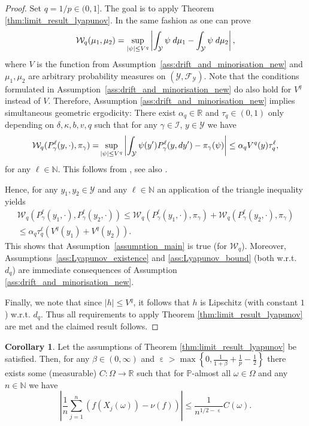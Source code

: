 \documentclass[12pt]{article}
\theoremstyle{definition}
\newtheorem{cor}[thm]{Corollary}
\renewcommand{\d}{{\rm d}}
\newcommand{\N}{\mathbb{N}}
\newcommand{\R}{\mathbb{R}}
\newcommand{\cY}{\mathcal{Y}}
\DeclareMathOperator{\eps}{\varepsilon}
\begin{document}
\begin{proof}
	Set $q=1/p \in (0,1]$.
	The goal is to apply Theorem \ref{thm:limit_result_lyapunov}.  
	In the same fashion as \cite[Lemma 2.1]{hairer2011yet} one can prove 
	\[
	\mathcal{W}_q(\mu_1, \mu_2) 
	=
	\sup_{\vert \psi \vert \leq V^{q}} \left\vert  \int_\cY \psi \; \d \mu_1  - \int_\cY \psi \; \d \mu_2 \right\vert,
	\]
	where $V $ is the function from Assumption~\ref{ass:drift_and_minorisation_new} and $\mu_1, \mu_2$ are arbitrary probability measures on $(\cY, \mathcal{F}_\cY)$. 
	Note that the conditions formulated in Assumption~\ref{ass:drift_and_minorisation_new} do also hold for $V^q$ instead of $V$. Therefore, 
	Assumption \ref{ass:drift_and_minorisation_new} implies simultaneous geometric ergodicity:
	There exist $\alpha_q \in \R$ and $\tau_q \in (0,1)$ only depending on $\delta, \kappa, b, v,q$ such that for any $\gamma \in \mathcal{I}$, $y \in \cY$ we have 
	\[
	{\mathcal{W}_q(P_\gamma^\ell(y,\cdot ), \pi_\gamma) = } 
	\sup_{\vert \psi \vert \leq V^{q}} \left\vert  \int_\cY \psi(y') P_\gamma^\ell (y, \d y')  - \pi_\gamma(\psi)\right\vert \leq \alpha_q V^q(y) \tau_q^\ell,
	\]
	for any $\ell \in \N$.
	This follows from \cite{Baxendale2005renewal}, see also \cite[Theorem 2]{andrieu2006ergodicity} \cite[Section 7]{roberts2007coupling}.
	
	Hence, for any $y_1 , y_2 \in \cY$ and any $\ell \in \N$ an application of the triangle inequality yields
	\begin{align*}
		\mathcal{W}_q(P^\ell_\gamma(y_1, \cdot ), P^\ell_\gamma(y_2, \cdot )  )
		\leq \mathcal{W}_q(P_\gamma^\ell(y_1,\cdot ), \pi_\gamma) +  \mathcal{W}_q(P_\gamma^\ell(y_2,\cdot ), \pi_\gamma) \\
		\leq \alpha_q \tau_q^\ell (V^q(y_1) + V^q(y_2)).
	\end{align*}
	This shows that Assumption~\ref{assumption_main} is true (for $\mathcal{W}_q$).
	Moreover, Assumptions~\ref{ass:Lyapunov_existence} and \ref{ass:Lyapunov_bound} (both w.r.t. $d_q$) are immediate consequences of Assumption \ref{ass:drift_and_minorisation_new}.
	
	Finally, we note that since $\vert h \vert \leq V^q$, it follows that $h$ is Lipschitz (with constant $1$) w.r.t. $d_q$. 
	Thus all requirements to apply Theorem \ref{thm:limit_result_lyapunov} are met and the claimed result follows. 
\end{proof}

\begin{cor}\label{cor:rate_geometric_ergodic}
	Let the assumptions of Theorem \ref{thm:limit_result_lyapunov} be satisfied. Then, for any $\beta \in (0,\infty)$ and $\eps>\max\left\{0, \frac{1}{1+\beta}+\frac{1}{p}- \frac{1}{2} \right\}$ there exists some (measurable) $C \colon \Omega \to \R$ such that for $\mathbb{P}$-almost all $\omega \in \Omega$ and any $n\in \N$ we have 
	\[
	\left\vert  \frac{1}{{n}} \sum_{j=1}^n \left(  f(X_j(\omega)) - \nu(f)  \right)  \right\vert \leq \frac{1}{n^{1/2 - \eps}}C(\omega) .
	\]
\end{cor}
\end{document}
